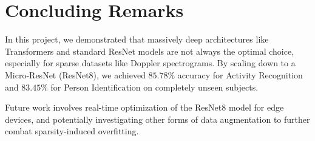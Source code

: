 \section{Concluding Remarks}
\label{sec:conclusions}
In this project, we demonstrated that massively deep architectures like Transformers and standard ResNet models are not always the optimal choice, especially for sparse datasets like Doppler spectrograms. By scaling down to a Micro-ResNet (ResNet8), we achieved $85.78\%$ accuracy for Activity Recognition and $83.45\%$ for Person Identification on completely unseen subjects.

Future work involves real-time optimization of the ResNet8 model for edge devices, and potentially investigating other forms of data augmentation to further combat sparsity-induced overfitting.
